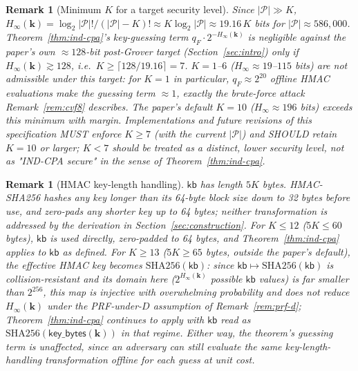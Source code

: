 \documentclass[11pt,a4paper]{article}
\newtheorem{remark}[theorem]{Remark}
\begin{document}
\begin{remark}[Minimum $K$ for a target security level]
\label{rem:min-K}
Since $|\mathcal{P}|\gg K$, $H_\infty(\mathbf{k}) = \log_2|\mathcal{P}|!/(|\mathcal{P}|-K)!
\approx K\log_2|\mathcal{P}| \approx 19.16\,K$ bits for $|\mathcal{P}|\approx
586{,}000$. Theorem~\ref{thm:ind-cpa}'s key-guessing term
$q_F\cdot 2^{-H_\infty(\mathbf{k})}$ is negligible against the paper's
own $\approx 128$-bit post-Grover target (Section~\ref{sec:intro}) only if
$H_\infty(\mathbf{k}) \gtrsim 128$, i.e.\ $K \geq \lceil 128/19.16\rceil = 7$.
$K=1$--$6$ ($H_\infty \approx 19$--$115$ bits) are \emph{not} admissible
under this target: for $K=1$ in particular, $q_F\approx 2^{20}$ offline
HMAC evaluations make the guessing term $\approx 1$, exactly the
brute-force attack Remark~\ref{rem:cvf8} describes. The paper's default
$K=10$ ($H_\infty\approx196$ bits) exceeds this minimum with margin.
Implementations and future revisions of this specification MUST enforce
$K\geq7$ (with the current $|\mathcal{P}|$) and SHOULD retain $K=10$ or
larger; $K<7$ should be treated as a distinct, lower security level, not
as "IND-CPA secure" in the sense of Theorem~\ref{thm:ind-cpa}.
\end{remark}

\begin{remark}[HMAC key-length handling]
\label{rem:hmac-keylen}
$\mathsf{kb}$ has length $5K$ bytes. HMAC-SHA256 hashes any key longer than
its 64-byte block size down to 32 bytes before use, and zero-pads any
shorter key up to 64 bytes; neither transformation is addressed by the
derivation in Section~\ref{sec:construction}. For $K\leq12$ ($5K\leq60$
bytes), $\mathsf{kb}$ is used directly, zero-padded to 64 bytes, and
Theorem~\ref{thm:ind-cpa} applies to $\mathsf{kb}$ as defined. For $K\geq13$
($5K\geq65$ bytes, outside the paper's default), the effective HMAC key
becomes $\mathrm{SHA256}(\mathsf{kb})$: since $\mathsf{kb}\mapsto
\mathrm{SHA256}(\mathsf{kb})$ is collision-resistant and its domain here
($2^{H_\infty(\mathbf{k})}$ possible $\mathsf{kb}$ values) is far smaller
than $2^{256}$, this map is injective with overwhelming probability and
does not reduce $H_\infty(\mathbf{k})$ under the PRF-under-$D$ assumption
of Remark~\ref{rem:prf-d}; Theorem~\ref{thm:ind-cpa} continues to apply
with $\mathsf{kb}$ read as $\mathrm{SHA256}(\mathsf{key\_bytes}(\mathbf{k}))$
in that regime. Either way, the theorem's guessing term is unaffected,
since an adversary can still evaluate the same key-length-handling
transformation offline for each guess at unit cost.
\end{remark}
\end{document}
